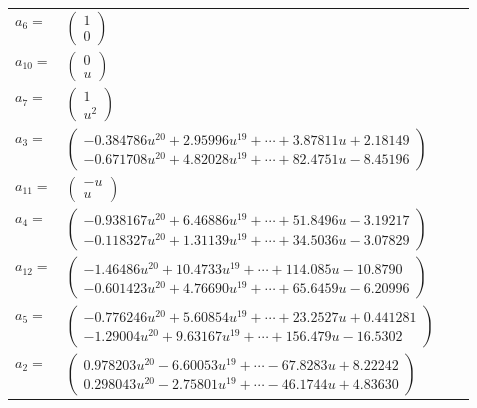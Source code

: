 \documentclass[1p]{elsarticle_modified}
\theoremstyle{definition}
\begin{document}
\begin{tabular}{m{7pt} m{180pt} m{7pt} m{180pt} }
\flushright $a_{6}=$&$\begin{pmatrix}1\\0\end{pmatrix}$ \\
\flushright $a_{10}=$&$\begin{pmatrix}0\\u\end{pmatrix}$ \\
\flushright $a_{7}=$&$\begin{pmatrix}1\\u^2\end{pmatrix}$ \\
\flushright $a_{3}=$&$\begin{pmatrix}-0.384786 u^{20}+2.95996 u^{19}+\cdots+3.87811 u+2.18149\\-0.671708 u^{20}+4.82028 u^{19}+\cdots+82.4751 u-8.45196\end{pmatrix}$ \\
\flushright $a_{11}=$&$\begin{pmatrix}- u\\u\end{pmatrix}$ \\
\flushright $a_{4}=$&$\begin{pmatrix}-0.938167 u^{20}+6.46886 u^{19}+\cdots+51.8496 u-3.19217\\-0.118327 u^{20}+1.31139 u^{19}+\cdots+34.5036 u-3.07829\end{pmatrix}$ \\
\flushright $a_{12}=$&$\begin{pmatrix}-1.46486 u^{20}+10.4733 u^{19}+\cdots+114.085 u-10.8790\\-0.601423 u^{20}+4.76690 u^{19}+\cdots+65.6459 u-6.20996\end{pmatrix}$ \\
\flushright $a_{5}=$&$\begin{pmatrix}-0.776246 u^{20}+5.60854 u^{19}+\cdots+23.2527 u+0.441281\\-1.29004 u^{20}+9.63167 u^{19}+\cdots+156.479 u-16.5302\end{pmatrix}$ \\
\flushright $a_{2}=$&$\begin{pmatrix}0.978203 u^{20}-6.60053 u^{19}+\cdots-67.8283 u+8.22242\\0.298043 u^{20}-2.75801 u^{19}+\cdots-46.1744 u+4.83630\end{pmatrix}$ \\

\end{tabular}
\end{document}
